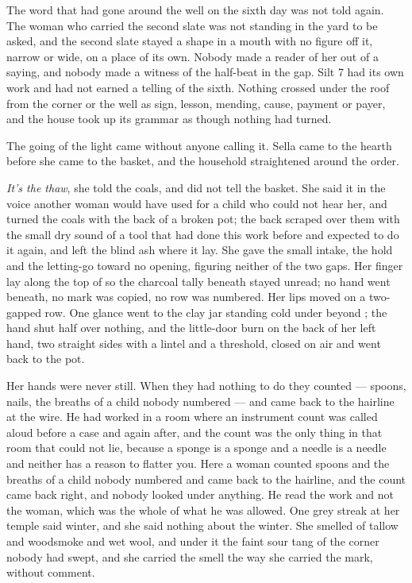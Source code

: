 The word that had gone around the well on the sixth day was not told again. The woman who carried the second slate was not standing in the yard to be asked, and the second slate stayed a shape in a mouth with no figure off it, narrow or wide, on a place of its own. Nobody made a reader of her out of a saying, and nobody made a witness of the half-beat in the gap. Silt 7 had its own work and had not earned a telling of the sixth. Nothing crossed under the roof from the corner or the well as sign, lesson, mending, cause, payment or payer, and the house took up its grammar as though nothing had turned.

\scenebreak

The going of the light came without anyone calling it. Sella came to the hearth before she came to the basket, and the household straightened around the order.

\emph{It's the thaw}, she told the coals, and did not tell the basket. She said it in the voice another woman would have used for a child who could not hear her, and turned the coals with the back of a broken pot; the back scraped over them with the small dry sound of a tool that had done this work before and expected to do it again, and left the blind ash where it lay. She gave the small intake, the hold and the letting-go toward no opening, figuring neither of the two gaps. Her finger lay along the top of  so the charcoal tally beneath stayed unread; no hand went beneath, no mark was copied, no row was numbered. Her lips moved on a two-gapped row. One glance went to the clay jar standing cold under  beyond ; the hand shut half over nothing, and the little-door burn on the back of her left hand, two straight sides with a lintel and a threshold, closed on air and went back to the pot.

Her hands were never still. When they had nothing to do they counted --- spoons, nails, the breaths of a child nobody numbered --- and came back to the hairline at the wire. He had worked in a room where an instrument count was called aloud before a case and again after, and the count was the only thing in that room that could not lie, because a sponge is a sponge and a needle is a needle and neither has a reason to flatter you. Here a woman counted spoons and the breaths of a child nobody numbered and came back to the hairline, and the count came back right, and nobody looked under anything. He read the work and not the woman, which was the whole of what he was allowed. One grey streak at her temple said winter, and she said nothing about the winter. She smelled of tallow and woodsmoke and wet wool, and under it the faint sour tang of the corner nobody had swept, and she carried the smell the way she carried the mark, without comment.

